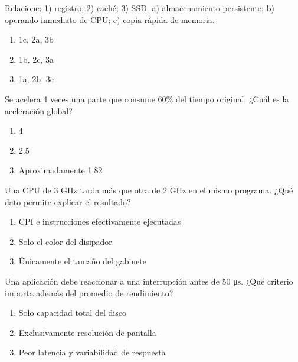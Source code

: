 \noindent\begin{minipage}{\linewidth}\setlength{\parskip}{4pt}\label{q:H-040}
Relacione: 1) registro; 2) caché; 3) SSD. a) almacenamiento persistente; b) operando inmediato de CPU; c) copia rápida de memoria.
\begin{enumerate}[label=\Alph*),nosep]
\item 1c, 2a, 3b
\item 1b, 2c, 3a
\item 1a, 2b, 3c
\end{enumerate}\end{minipage}\par\medskip

\noindent\begin{minipage}{\linewidth}\setlength{\parskip}{4pt}\label{q:H-041}
Se acelera 4 veces una parte que consume 60\% del tiempo original. ¿Cuál es la aceleración global?
\begin{enumerate}[label=\Alph*),nosep]
\item 4
\item 2.5
\item Aproximadamente 1.82
\end{enumerate}\end{minipage}\par\medskip

\noindent\begin{minipage}{\linewidth}\setlength{\parskip}{4pt}\label{q:H-042}
Una CPU de 3 GHz tarda más que otra de 2 GHz en el mismo programa. ¿Qué dato permite explicar el resultado?
\begin{enumerate}[label=\Alph*),nosep]
\item CPI e instrucciones efectivamente ejecutadas
\item Solo el color del disipador
\item Únicamente el tamaño del gabinete
\end{enumerate}\end{minipage}\par\medskip

\noindent\begin{minipage}{\linewidth}\setlength{\parskip}{4pt}\label{q:H-043}
Una aplicación debe reaccionar a una interrupción antes de 50 μs. ¿Qué criterio importa además del promedio de rendimiento?
\begin{enumerate}[label=\Alph*),nosep]
\item Solo capacidad total del disco
\item Exclusivamente resolución de pantalla
\item Peor latencia y variabilidad de respuesta
\end{enumerate}\end{minipage}\par\medskip

